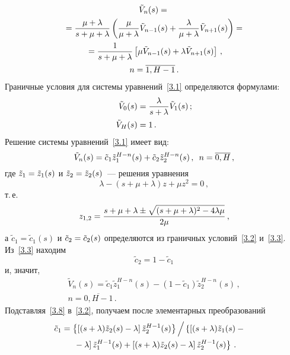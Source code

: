 \begin{multicols}{2}
\noindent
\begin{multline}
\tilde{V}_n(s) ={}\\
{}= \displaystyle\frac{\displaystyle \mu+\lambda\mathstrut}{\displaystyle s+\mu+\lambda\mathstrut}
 \left(
\displaystyle\frac{\displaystyle \mu\mathstrut}{\displaystyle  \mu+\lambda\mathstrut} \tilde{V}_{n-1}(s) +
\displaystyle\frac{\displaystyle \lambda \mathstrut}{\displaystyle \mu+\lambda\mathstrut} \tilde{V}_{n+1}(s) \right)
={}\\
{}=
\displaystyle\frac{\displaystyle 1\mathstrut}{\displaystyle s+\mu+\lambda\mathstrut} \left[
\mu \tilde{V}_{n-1}(s) + \lambda \tilde{V}_{n+1}(s) \right]
\,,\\
 n=\overline{1,H-1}\,.
\label{3.1}
\end{multline}
Граничные условия для системы уравнений~\eqref{3.1} определяются
формулами:
\begin{align}
\label{3.2}
\tilde{V}_{0}(s) &= \displaystyle\frac{\displaystyle \lambda \mathstrut}{\displaystyle s+\lambda\mathstrut} \tilde{V}_1(s)\,;
\\
\label{3.3}
\tilde{V}_{H}(s) &= 1 \,.
\end{align}
Решение системы уравнений~\eqref{3.1} имеет вид:
\begin{equation*}
\tilde{V}_{n}(s) = \tilde{c}_1 \tilde{z}_1^{H-n}(s) +
\tilde{c}_2 \tilde{z}_2^{H-n}(s) \,,\enskip n=\overline{0,H}\,,
\end{equation*}
где $\tilde{z}_1\hm=\tilde{z}_1(s)$ и $\tilde{z}_2\hm=\tilde{z}_2(s)$~---
решения уравнения
\begin{equation*}
\lambda - (s + \mu + \lambda) z + \mu z^2 =0\,,
\end{equation*}
т.\,е.
\begin{equation*}
z_{1,2} = \displaystyle\frac{\displaystyle  s+\mu+\lambda \pm \sqrt {(s+\mu+\lambda)^2 - 4 \lambda \mu}\mathstrut}{\displaystyle 2 \mu \mathstrut} \,,
\end{equation*}
а $\tilde{c}_1=\tilde{c}_1(s)$ и $\tilde{c}_2\hm=\tilde{c}_2(s)$
определяются из
граничных условий~\eqref{3.2} и~\eqref{3.3}.
Из~\eqref{3.3} находим
\begin{equation*}
\tilde{c}_2 = 1 - \tilde{c}_1
\end{equation*}
и, значит,
\begin{multline}
\label{3.8}
\tilde{V}_{n}(s) = \tilde{c}_1 \tilde{z}_1^{H-n}(s)
- (1-\tilde{c}_1) \tilde{z}_2^{H-n}(s) \,,\\ n=\overline{0,H-1}\,.
\end{multline}
Подставляя~\eqref{3.8} в~\eqref{3.2},
получаем после элементарных преобразований
\begin{multline*}
\hspace*{-9.5pt}\tilde{c}_1 = \left\{ \left[(s+\lambda) \tilde{z}_2(s) - \lambda\right] \tilde{z}_2^{H-1}(s)
\right\}\Big/ \left\{\left[(s+\lambda) \tilde{z}_1(s) - {}\right.\right.\hspace*{-1.87894pt}\\
\left.\left.{}-\lambda\right] \tilde{z}_1^{H-1}(s)
+ \left[(s+\lambda) \tilde{z}_2(s) - \lambda\right] \tilde{z}_2^{H-1}(s)\right\}\,.
\end{multline*}


\end{multicols}
